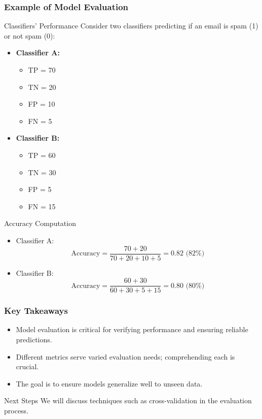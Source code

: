 \documentclass[aspectratio=169]{beamer}
\begin{document}
\begin{frame}[fragile]
    \frametitle{Example of Model Evaluation}
    \begin{block}{Classifiers' Performance}
        Consider two classifiers predicting if an email is spam (1) or not spam (0):
        \begin{itemize}
            \item \textbf{Classifier A:} 
                \begin{itemize}
                    \item TP = 70
                    \item TN = 20
                    \item FP = 10
                    \item FN = 5
                \end{itemize}
            \item \textbf{Classifier B:}
                \begin{itemize}
                    \item TP = 60
                    \item TN = 30
                    \item FP = 5
                    \item FN = 15
                \end{itemize}
        \end{itemize}
    \end{block}
    
    \begin{block}{Accuracy Computation}
        \begin{itemize}
            \item Classifier A: 
            \[
            \text{Accuracy} = \frac{70 + 20}{70 + 20 + 10 + 5} = 0.82 \text{ (82\%)}
            \]
            \item Classifier B: 
            \[
            \text{Accuracy} = \frac{60 + 30}{60 + 30 + 5 + 15} = 0.80 \text{ (80\%)}
            \]
        \end{itemize}
    \end{block}
\end{frame}

\begin{frame}[fragile]
    \frametitle{Key Takeaways}
    \begin{itemize}
        \item Model evaluation is critical for verifying performance and ensuring reliable predictions.
        \item Different metrics serve varied evaluation needs; comprehending each is crucial.
        \item The goal is to ensure models generalize well to unseen data.
    \end{itemize}
    
    \begin{block}{Next Steps}
        We will discuss techniques such as cross-validation in the evaluation process.
    \end{block}
\end{frame}
\end{document}
